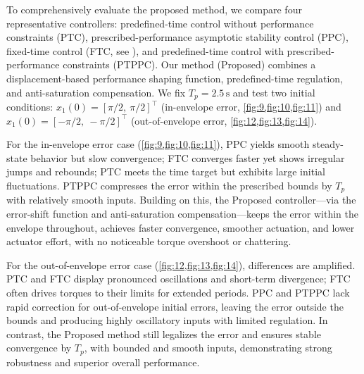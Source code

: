 \documentclass[pdflatex,sn-mathphys-num]{sn-jnl}%
\theoremstyle{thmstyleone}%
\theoremstyle{thmstyletwo}%
\theoremstyle{thmstylethree}%
\begin{document}


To comprehensively evaluate the proposed method, we compare four representative controllers: predefined-time control without performance constraints (PTC), prescribed-performance asymptotic  stability control (PPC), fixed-time control (FTC, see \cite{CaoEtAl_2023_ReinforcementLearningBased}), and predefined-time control with prescribed-performance constraints (PTPPC). Our method (Proposed) combines a displacement-based performance shaping function, predefined-time regulation, and anti-saturation compensation. We fix $T_p=2.5\,\mathrm{s}$ and test two initial conditions: $x_1(0)=[\pi/2,\ \pi/2]^\top$ (in-envelope error, \cref{fig:9,fig:10,fig:11}) and $x_1(0)=[-\pi/2,\ -\pi/2]^\top$ (out-of-envelope error, \cref{fig:12,fig:13,fig:14}).

For the in-envelope error case (\cref{fig:9,fig:10,fig:11}), PPC yields smooth steady-state behavior but slow convergence; FTC converges faster yet shows irregular jumps and rebounds; PTC meets the time target but exhibits large initial fluctuations. PTPPC compresses the error within the prescribed bounds by $T_p$ with relatively smooth inputs. Building on this, the Proposed controller—via the error-shift function and anti-saturation compensation—keeps the error within the envelope throughout, achieves faster convergence, smoother actuation, and lower actuator effort, with no noticeable torque overshoot or chattering.

For the out-of-envelope error case (\cref{fig:12,fig:13,fig:14}), differences are amplified. PTC and FTC display pronounced oscillations and short-term divergence; FTC often drives torques to their limits for extended periods. PPC and PTPPC lack rapid correction for out-of-envelope initial errors, leaving the error outside the bounds and producing highly oscillatory inputs with limited regulation. In contrast, the Proposed method still legalizes the error and ensures stable convergence by $T_p$, with bounded and smooth inputs, demonstrating strong robustness and superior overall performance.
\end{document}
